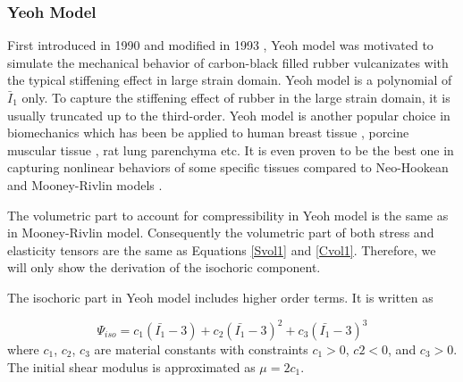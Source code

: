 %
\subsubsection{Yeoh Model}
First introduced in 1990 \cite{Yeoh} and modified in 1993 \cite{Yeoh2}, Yeoh model was motivated to simulate the mechanical behavior of carbon-black filled rubber vulcanizates with the typical stiffening effect in large strain domain. Yeoh model is a polynomial of $\bar{I}_1$ only.  To capture the stiffening effect of rubber in the large strain domain, it is usually truncated up to the third-order. Yeoh model is another popular choice in biomechanics which has been be applied to human breast tissue \cite{OHagen}, porcine muscular tissue \cite{Bols2}, rat lung parenchyma \cite{Wall, Wall2} etc. It is even proven to be the best one in capturing nonlinear behaviors of some specific tissues compared to Neo-Hookean and Mooney-Rivlin models \cite{Zaeimdar}.

The volumetric part to account for compressibility in Yeoh model is the same as in Mooney-Rivlin model. Consequently the volumetric part of both stress and elasticity tensors are the same as Equations \ref{Svol1} and \ref{Cvol1}. Therefore, we will only show the derivation of the isochoric component.

The isochoric part in Yeoh model includes higher order terms. It is written as

\begin{equation} \label{iso2}
\Psi_{iso} = c_1(\bar{I_1} - 3) + c_2(\bar{I_1} - 3)^2 + c_3(\bar{I_1} - 3)^3
\end{equation}
where $c_1$, $c_2$, $c_3$ are material constants with constraints $c_1 > 0$, $c2 < 0$, and $c_3 > 0$. The initial shear modulus is approximated as $\mu = 2c_1$.

